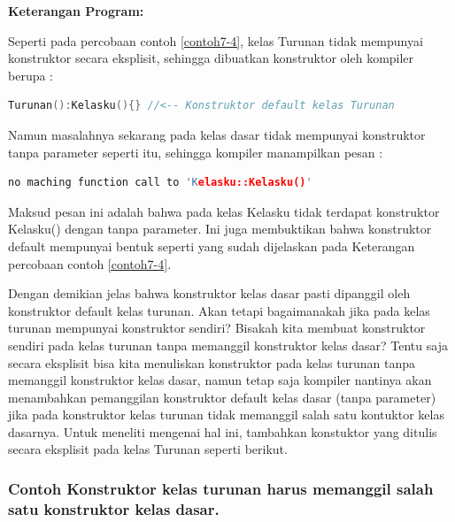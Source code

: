 \begin{figure}[htbp]
\centering
{}

\end{figure}

\textbf{Keterangan Program:}

Seperti pada percobaan contoh \ref{contoh7-4}, kelas Turunan tidak mempunyai
konstruktor secara eksplisit, sehingga dibuatkan konstruktor oleh
kompiler berupa :

\begin{lstlisting}[language=c++, numbers=none]
Turunan():Kelasku(){} //<-- Konstruktor default kelas Turunan
\end{lstlisting}

Namun masalahnya sekarang pada kelas dasar tidak mempunyai konstruktor
tanpa parameter seperti itu, sehingga kompiler manampilkan pesan :

\begin{lstlisting}[language=c++, numbers=none]
no maching function call to 'Kelasku::Kelasku()'
\end{lstlisting}

Maksud pesan ini adalah bahwa pada kelas Kelasku tidak terdapat
konstruktor Kelasku() dengan tanpa parameter. Ini juga membuktikan bahwa
konstruktor default mempunyai bentuk seperti yang sudah dijelaskan pada
Keterangan percobaan contoh \ref{contoh7-4}.

Dengan demikian jelas bahwa konstruktor kelas dasar pasti dipanggil oleh
konstruktor default kelas turunan. Akan tetapi bagaimanakah jika pada
kelas turunan mempunyai konstruktor sendiri? Bisakah kita membuat
konstruktor sendiri pada kelas turunan tanpa memanggil konstruktor kelas
dasar? Tentu saja secara eksplisit bisa kita menuliskan konstruktor pada
kelas turunan tanpa memanggil konstruktor kelas dasar, namun tetap saja
kompiler nantinya akan menambahkan pemanggilan konstruktor default kelas
dasar (tanpa parameter) jika pada konstruktor kelas turunan tidak
memanggil salah satu kontuktor kelas dasarnya. Untuk meneliti mengenai
hal ini, tambahkan konstuktor yang ditulis secara eksplisit pada kelas
Turunan seperti berikut.

\subsubsection*{Contoh Konstruktor kelas turunan harus memanggil salah satu konstruktor kelas dasar.}

